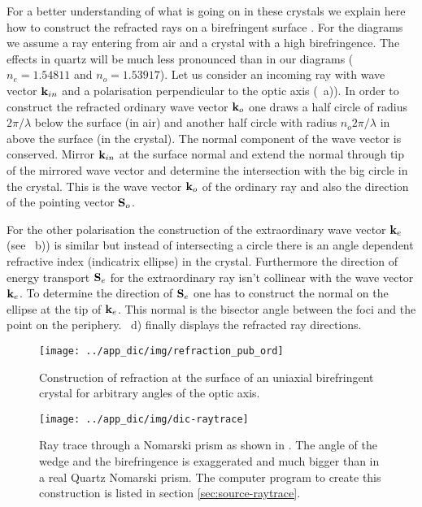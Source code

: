 For a better understanding of what is going on in these crystals we
explain here how to construct the refracted rays on a birefringent
surface \cite{1991Saleh}. For the diagrams we assume a ray entering
from air and a crystal with a high birefringence. The effects in
quartz will be much less pronounced than in our diagrams
($n_e=1.54811$ and $n_o=1.53917$). Let us consider an incoming ray
with wave vector $\mathbf{k}_{in}$ and a polarisation perpendicular to the
optic axis (~a)). In order to
construct the refracted ordinary wave vector $\mathbf{k}_o$ one draws a half
circle of radius $2\pi/\lambda$ below the surface (in air) and another
half circle with radius $n_o2\pi/\lambda$ in above the surface (in the
crystal). The normal component of the wave vector is conserved. Mirror
$\mathbf{k}_{in}$ at the surface normal and extend the normal through tip of
the mirrored wave vector and determine the intersection with the big
circle in the crystal. This is the wave vector $\mathbf{k}_o$ of the ordinary
ray and also the direction of the pointing vector $\mathbf{S}_o$.

For the other polarisation the construction of the extraordinary wave
vector $\mathbf{k}_e$ (see ~b)) is similar
but instead of intersecting a circle there is an angle dependent
refractive index (indicatrix ellipse) in the crystal.  Furthermore the
direction of energy transport $\mathbf{S}_e$ for the extraordinary ray isn't
collinear with the wave vector $\mathbf{k}_e$. To determine the direction of
$\mathbf{S}_e$ one has to construct the normal on the ellipse at the tip of
$\mathbf{k}_e$. This normal is the bisector angle between the foci and the
point on the periphery. ~d) finally
displays the refracted ray directions.
\begin{figure}[htb]
  \centering
  \texttt{[image: ../app\_dic/img/refraction\_pub\_ord]}
  \caption{Construction of refraction at the surface of an uniaxial
    birefringent crystal for arbitrary angles of the optic axis.}
  \label{fig:refraction_pub_ord}
\end{figure}

\begin{figure}[htb]
  \centering
  \texttt{[image: ../app\_dic/img/dic-raytrace]}
  \caption{Ray trace through a Nomarski prism as shown in
    . The angle of the wedge and the birefringence
    is exaggerated and much bigger than in a real Quartz Nomarski
    prism. The computer program to create this construction is listed
    in section \ref{sec:source-raytrace}.}
  \label{fig:dic-raytrace}
\end{figure}

